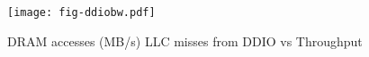 \begin{figure}[H]
\texttt{[image: fig-ddiobw.pdf]}
\caption{DRAM accesses (MB/s) LLC misses from DDIO vs Throughput}
\label{fig:ddiobw}
\end{figure}
